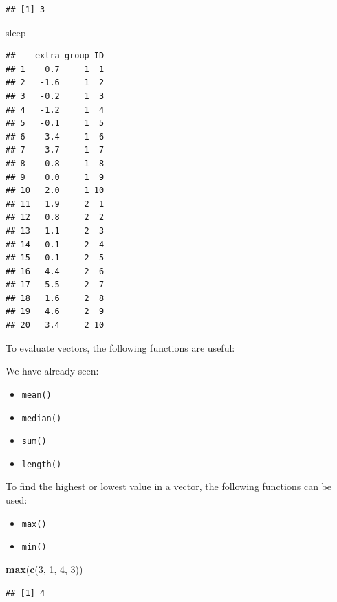 \documentclass[
]{book}
\newenvironment{Shaded}{\begin{snugshade}}{\end{snugshade}}
\newcommand{\DecValTok}[1]{\textcolor[rgb]{0.00,0.00,0.81}{#1}}
\newcommand{\FunctionTok}[1]{\textcolor[rgb]{0.13,0.29,0.53}{\textbf{#1}}}
\newcommand{\NormalTok}[1]{#1}
\begin{document}
\begin{verbatim}
## [1] 3
\end{verbatim}

\begin{Shaded}
\begin{Highlighting}[]
\NormalTok{sleep}
\end{Highlighting}
\end{Shaded}

\begin{verbatim}
##    extra group ID
## 1    0.7     1  1
## 2   -1.6     1  2
## 3   -0.2     1  3
## 4   -1.2     1  4
## 5   -0.1     1  5
## 6    3.4     1  6
## 7    3.7     1  7
## 8    0.8     1  8
## 9    0.0     1  9
## 10   2.0     1 10
## 11   1.9     2  1
## 12   0.8     2  2
## 13   1.1     2  3
## 14   0.1     2  4
## 15  -0.1     2  5
## 16   4.4     2  6
## 17   5.5     2  7
## 18   1.6     2  8
## 19   4.6     2  9
## 20   3.4     2 10
\end{verbatim}

To evaluate vectors, the following functions are useful:

We have already seen:

\begin{itemize}
\item
  \texttt{mean()}
\item
  \texttt{median()}
\item
  \texttt{sum()}
\item
  \texttt{length()}
\end{itemize}

To find the highest or lowest value in a vector, the following functions can be used:

\begin{itemize}
\item
  \texttt{max()}
\item
  \texttt{min()}
\end{itemize}

\begin{Shaded}
\begin{Highlighting}[]
\FunctionTok{max}\NormalTok{(}\FunctionTok{c}\NormalTok{(}\DecValTok{3}\NormalTok{, }\DecValTok{1}\NormalTok{, }\DecValTok{4}\NormalTok{, }\DecValTok{3}\NormalTok{))}
\end{Highlighting}
\end{Shaded}

\begin{verbatim}
## [1] 4
\end{verbatim}
\end{document}
